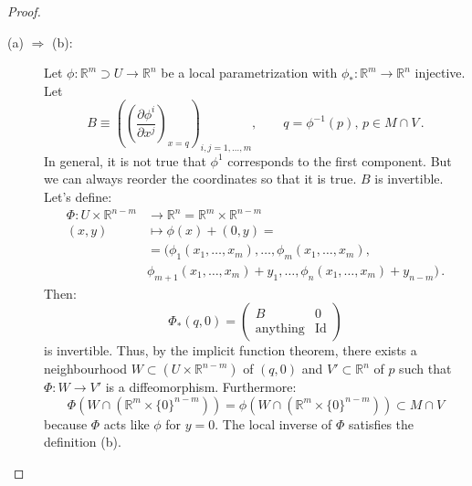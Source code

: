 \documentclass[a4paper,11pt,titlepage, article, oneside]{memoir}
\numberwithin{equation}{section}
\theoremstyle{definition}
\theoremstyle{remark}
\newcommand{\rfield}{\mathbb{R}}
\newcommand{\defonde}[2]{\frac{\partial {#1}}{\partial {#2}}}
\begin{document}
\begin{proof}
\begin{description}
\item[(a) $\Rightarrow$ (b):] Let $\phi \colon \rfield^m \supset U \rightarrow \rfield^n$ be a local parametrization with $\phi_*\colon \rfield^m \rightarrow \rfield^n$ injective. Let
$$B \equiv \left( \left (\defonde{\phi^i}{x^j} \right)_{x=q} \right)_{i, j = 1, \ldots ,m}, \qquad q = \phi^{-1}(p), \, p \in M \cap V \, .$$
In general, it is not true that $\phi^1$ corresponds to the first component. But we can always reorder the coordinates so that it is true. $B$ is invertible. Let's define:
\begin{align*}
\Phi \colon U \times \rfield^{n-m} &\rightarrow \rfield^n= \rfield^m \times \rfield^{n-m} \\
(x, y) &\mapsto \phi(x) + (0, y) =  \\ &= ( \phi_1(x_1, \ldots, x_m), \ldots, \phi_m(x_1, \ldots, x_m), \\
& \phi_{m+1}(x_1, \ldots, x_m) + y_1, \ldots, \phi_n(x_1, \ldots, x_m) + y_{n-m} ) \, .
\end{align*}
Then:
\[ \Phi_*(q, 0) = \left (
\begin{array}{c|c}
B & 0 \\
\hline
\text{anything} & \text{Id}
\end{array} \right) \]
is invertible. Thus, by the implicit function theorem, there exists a neighbourhood $W \subset (U \times \rfield^{n-m})$ of $(q, 0)$ and $V' \subset \rfield^n$ of $p$ such that $\Phi \colon W \rightarrow V'$ is a diffeomorphism. Furthermore:
\[ \Phi\left ( W \cap (\rfield^m \times \{0\}^{n-m}) \right) = \phi\left( W \cap (\rfield^m \times \{0\}^{n-m}) \right) \subset M \cap V \]
because $\Phi$ acts like $\phi$ for $y=0$. The local inverse of $\Phi$ satisfies the definition (b).
\end{description}
\end{proof}
\end{document}
